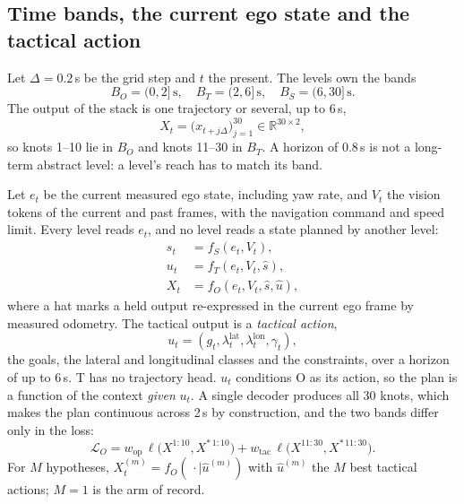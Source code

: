 \documentclass[10pt,twocolumn]{article}
\makeatletter
\theoremstyle{remark}
\newcommand{\Rset}{\mathbb{R}}
\renewcommand\paragraph{\@startsection{paragraph}{4}{\z@}{1.6ex \@plus .5ex \@minus .2ex}{-1em}{\normalfont\normalsize\bfseries}}
\makeatother
\begin{document}
\subsection{Time bands, the current ego state and the tactical action}\label{sec:bands}
Let $\Delta=0.2$\,s be the grid step and $t$ the present. The levels own the bands
\begin{equation}
B_O=(0,2]\,\mathrm{s},\quad B_T=(2,6]\,\mathrm{s},\quad B_S=(6,30]\,\mathrm{s}.
\end{equation}
The output of the stack is one trajectory or several, up to 6\,s,
\begin{equation}
X_t=\big(x_{t+j\Delta}\big)_{j=1}^{30}\in\Rset^{30\times2},
\end{equation}
so knots 1--10 lie in $B_O$ and knots 11--30 in $B_T$. A horizon of 0.8\,s is not a long-term abstract level: a level's reach has to
match its band.

\paragraph{The cascade.} Let $e_t$ be the current measured ego state, including yaw rate, and $V_t$ the vision tokens of the current and
past frames, with the navigation command and speed limit. Every level reads $e_t$, and no level reads a state planned by another level:
\begin{equation}\label{eq:cascade}
\begin{aligned}
s_t&=f_S(e_t,V_t),\\
u_t&=f_T(e_t,V_t,\hat s),\\
X_t&=f_O(e_t,V_t,\hat s,\hat u),
\end{aligned}
\end{equation}
where a hat marks a held output re-expressed in the current ego frame by measured odometry. The tactical output is a \emph{tactical
action},
\begin{equation}
u_t=(g_t,\lambda^{\mathrm{lat}}_t,\lambda^{\mathrm{lon}}_t,\gamma_t),
\end{equation}
the goals, the lateral and longitudinal classes and the constraints, over a horizon of up to 6\,s. T has no trajectory head. $u_t$
conditions O as its action, so the plan is a function of the context \emph{given} $u_t$. A single decoder produces all 30 knots, which
makes the plan continuous across 2\,s by construction, and the two bands differ only in the loss:
\begin{equation}
\mathcal L_O=w_{\mathrm{op}}\,\ell\big(X^{1:10},X^{\ast\,1:10}\big)+w_{\mathrm{tac}}\,\ell\big(X^{11:30},X^{\ast\,11:30}\big).
\end{equation}
For $M$ hypotheses, $X^{(m)}_t=f_O(\,\cdot\mid\hat u^{(m)})$ with $\hat u^{(m)}$ the $M$ best tactical actions; $M=1$ is the arm of record.
\end{document}
